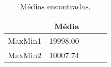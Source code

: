 \begin{table}[!htb]
	\centering
	\caption[Médias encontradas]{Médias encontradas.
	\label{tab:medias}}
	\begin{tabular}{rrrrr}
		\toprule
			& Média &  \\
		\midrule
			MaxMin1 & 19998.00 \\
			MaxMin2 & 10007.74 \\
		\bottomrule
	\end{tabular}
\end{table}

